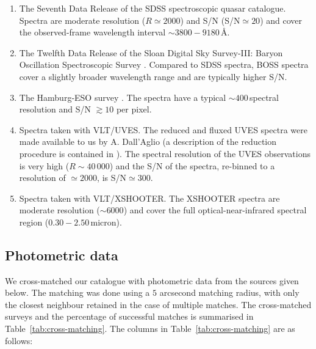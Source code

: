 \begin{enumerate}

 \item The Seventh Data Release \citep[DR$7$;][]{schneider10} of the SDSS spectroscopic quasar catalogue. Spectra are moderate resolution ($R\simeq2000$) and S/N (S/N$\simeq20$) and cover the observed-frame wavelength interval $\sim3800-9180$\,\AA.   
 
 \item The Twelfth Data Release \citep[DR$12$;][]{paris17} of the Sloan Digital Sky Survey-III: Baryon Oscillation Spectroscopic Survey \citep[SDSS-III/BOSS;][]{dawson13}. Compared to SDSS spectra, BOSS spectra cover a slightly broader wavelength range and are typically higher S/N. 

 \item The Hamburg-ESO survey \citep{wisotzki00}. The spectra have a typical $\sim400$\,\kms spectral resolution and S/N $\gtrsim10$ per pixel. 

 \item Spectra taken with VLT/UVES. The reduced and fluxed UVES spectra were made available to us by A. Dall'Aglio (a description of the reduction procedure is contained in \citealt{dallaglio08}). The spectral resolution of the UVES observations is very high ($R\sim40\,000$) and the S/N of the spectra, re-binned to a resolution of $\simeq2000$, is S/N$\simeq300$. 

 \item Spectra taken with VLT/XSHOOTER. The XSHOOTER spectra are moderate resolution ($\sim6000$) and cover the full optical-near-infrared spectral region ($0.30-2.50$\,micron). 

\end{enumerate}

\subsection{Photometric data}

We cross-matched our catalogue with photometric data from the sources given below. 
The matching was done using a $5$ arcsecond matching radius, with only the closest neighbour retained in the case of multiple matches. 
The cross-matched surveys and the percentage of successful matches is summarised in Table~\ref{tab:cross-matching}. 
The columns in Table~\ref{tab:cross-matching} are as follows:

